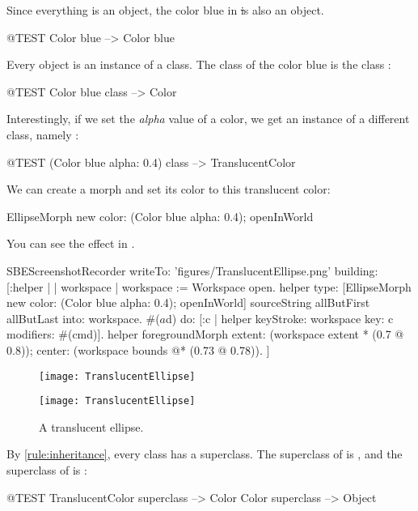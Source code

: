 \documentclass[a4paper,10pt,twoside]{book}
\begin{document}
Since everything is an object, the color blue in \st is also an object.
\begin{code}{@TEST}
Color blue --> Color blue
\end{code}

\noindent
Every object is an instance of a class. The class of the color blue is the class :
\begin{code}{@TEST}
Color blue class --> Color
\end{code}

\noindent
Interestingly, if we set the \emph{alpha} value of a color, we get an instance of a different class, namely :
\begin{code}{@TEST}
(Color blue alpha: 0.4) class --> TranslucentColor
\end{code}

\noindent
We can create a morph and set its color to this translucent color:
\begin{code}{}
EllipseMorph new color: (Color blue alpha: 0.4); openInWorld
\end{code}
\noindent
You can see the effect in .

\begin{ExecuteSmalltalkScript}
SBEScreenshotRecorder writeTo: 'figures/TranslucentEllipse.png' building: [:helper |
	| workspace |
	workspace := Workspace open.
	helper
		type: [EllipseMorph new
			color: (Color blue alpha: 0.4);
			openInWorld]
				sourceString allButFirst allButLast
		into: workspace.
	#($a $d) do: [:c | helper keyStroke: workspace key: c modifiers: #(cmd)].
	helper foregroundMorph
		extent: (workspace extent * (0.7 @ 0.8));
		center: (workspace bounds @* (0.73 @ 0.78)).
]
\end{ExecuteSmalltalkScript}
\begin{center}
\begin{figure}[!ht]
\ifluluelse
	{\centerline {\texttt{[image: TranslucentEllipse]}}}
	{\centerline {\texttt{[image: TranslucentEllipse]}}}
\caption{A translucent ellipse.\label{fig:translucentEllipse}}
\end{figure}
\end{center}

By \ref{rule:inheritance}, every class has a superclass.
The superclass of  is , and the superclass of  is :
\begin{code}{@TEST}
TranslucentColor superclass --> Color
Color superclass                   --> Object
\end{code}
\end{document}
